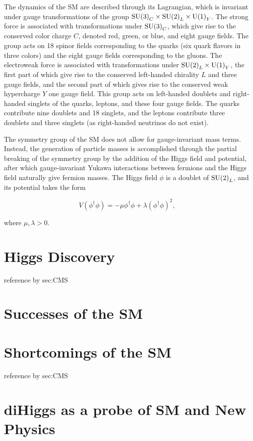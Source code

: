 The dynamics of the SM are described through its Lagrangian, which is invariant under
gauge transformations of the group ${\rm SU(3)}_C \times {\rm SU(2)}_L \times {\rm U(1)}_Y$.
The strong force is associated with transformations under ${\rm SU(3)}_C$, which give rise to
the conserved color charge $C$, denoted red, green, or blue, and eight gauge fields.
The group acts on 18 spinor fields corresponding to the quarks (six quark flavors in three colors)
and the eight gauge fields corresponding to the gluons.
The electroweak force is associated with transformations under ${\rm SU(2)}_L \times {\rm U(1)}_Y$,
the first part of which give rise to the conserved left-handed chirality $L$ and three gauge fields,
and the second part of which gives rise to the conserved weak hypercharge $Y$ one gauge field.
This group acts on left-handed doublets and right-handed singlets of the quarks, leptons, and
these four gauge fields. The quarks contribute nine doublets and 18 singlets, and the leptons contribute
three doublets and three singlets (as right-handed neutrinos do not exist).

The symmetry group of the SM does not allow for gauge-invariant mass terms. Instead,
the generation of particle masses is accomplished through the partial breaking of the
symmetry group by the addition of the Higgs field and potential, after which gauge-invariant
Yukawa interactions between fermions and the Higgs field naturally give fermion masses.
The Higgs field $\phi$ is a doublet of ${\rm SU(2)}_L$, and its potential takes the form

\begin{equation}
V(\phi^\dagger\phi) = -\mu\phi^\dagger\phi + \lambda(\phi^\dagger\phi)^2 ,
\end{equation}

where $\mu,\lambda > 0$.

\section{Higgs Discovery\label{sec:discovery}}
reference by sec:CMS

\section{Successes of the SM\label{sec:SMsuccess}}

\section{Shortcomings of the SM\label{sec:SMshortcomings}}
reference by sec:CMS


\section{diHiggs as a probe of SM and New Physics\label{sec:diHiggs}}



